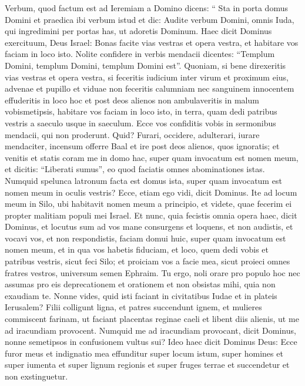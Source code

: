\begin{biblechapter}
\begin{biblechapter}
\begin{biblechapter}
\begin{biblechapter}
\begin{biblechapter}
\begin{biblechapter}
\begin{biblechapter}
\verse Verbum, quod factum est ad Ieremiam a Domino dicens: 
\verse “ Sta in porta domus Domini et praedica ibi verbum istud et dic: Audite verbum Domini, omnis Iuda, qui ingredimini per portas has, ut adoretis Dominum. 
\verse Haec dicit Dominus exercituum, Deus Israel: Bonas facite vias vestras et opera vestra, et habitare vos faciam in loco isto. 
\verse Nolite confidere in verbis mendacii dicentes: “Templum Domini, templum Domini, templum Domini est”. 
\verse Quoniam, si bene direxeritis vias vestras et opera vestra, si feceritis iudicium inter virum et proximum eius, 
\verse advenae et pupillo et viduae non feceritis calumniam nec sanguinem innocentem effuderitis in loco hoc et post deos alienos non ambulaveritis in malum vobismetipsis, 
\verse habitare vos faciam in loco isto, in terra, quam dedi patribus vestris a saeculo usque in saeculum.
 \verse Ecce vos confiditis vobis in sermonibus mendacii, qui non proderunt. 
\verse Quid? Furari, occidere, adulterari, iurare mendaciter, incensum offerre Baal et ire post deos alienos, quos ignoratis; 
\verse et venitis et statis coram me in domo hac, super quam invocatum est nomen meum, et dicitis: “Liberati sumus”, eo quod faciatis omnes abominationes istas. 
\verse Numquid spelunca latronum facta est domus ista, super quam invocatum est nomen meum in oculis vestris?
 Ecce, etiam ego vidi, dicit Dominus. 
\verse Ite ad locum meum in Silo, ubi habitavit nomen meum a principio, et videte, quae fecerim ei propter malitiam populi mei Israel. 
\verse Et nunc, quia fecistis omnia opera haec, dicit Dominus, et locutus sum ad vos mane consurgens et loquens, et non audistis, et vocavi vos, et non respondistis, 
\verse faciam domui huic, super quam invocatum est nomen meum, et in qua vos habetis fiduciam, et loco, quem dedi vobis et patribus vestris, sicut feci Silo; 
\verse et proiciam vos a facie mea, sicut proieci omnes fratres vestros, universum semen Ephraim.
 \verse Tu ergo, noli orare pro populo hoc nec assumas pro eis deprecationem et orationem et non obsistas mihi, quia non exaudiam te. 
\verse Nonne vides, quid isti faciant in civitatibus Iudae et in plateis Ierusalem? 
\verse Filii colligunt ligna, et patres succendunt ignem, et mulieres commiscent farinam, ut faciant placentas reginae caeli et libent diis alienis, ut me ad iracundiam provocent. 
\verse Numquid me ad iracundiam provocant, dicit Dominus, nonne semetipsos in confusionem vultus sui? 
\verse Ideo haec dicit Dominus Deus: Ecce furor meus et indignatio mea effunditur super locum istum, super homines et super iumenta et super lignum regionis et super fruges terrae et succendetur et non exstinguetur.

\end{biblechapter}
\end{biblechapter}
\end{biblechapter}
\end{biblechapter}
\end{biblechapter}
\end{biblechapter}
\end{biblechapter}
